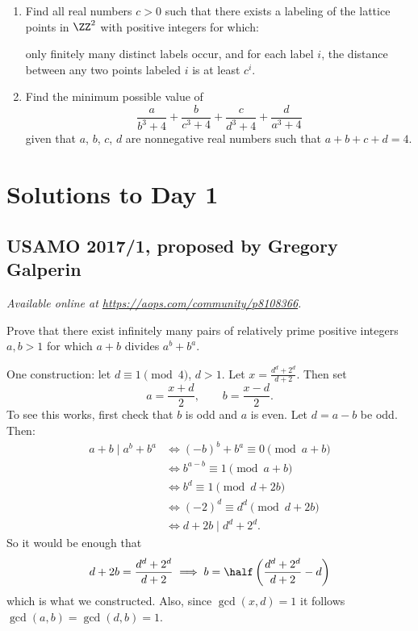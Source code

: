 \documentclass[11pt]{scrartcl}
\begin{document}
\begin{enumerate}[\bfseries 1.]
\item %
Find all real numbers $c > 0$ such that there exists a labeling
of the lattice points in $\ZZ^2$ with positive integers for which:
\begin{itemize}
  \ii only finitely many distinct labels occur, and
  \ii for each label $i$, the distance between any two points
  labeled $i$ is at least $c^i$.
\end{itemize}

\item %
Find the minimum possible value of
\[ \frac{a}{b^3+4} + \frac{b}{c^3+4}
  + \frac{c}{d^3+4} + \frac{d}{a^3+4} \]
given that $a$, $b$, $c$, $d$ are nonnegative real numbers
such that $a+b+c+d=4$.

\end{enumerate}
\pagebreak

\section{Solutions to Day 1}
\subsection{USAMO 2017/1, proposed by Gregory Galperin}
\textsl{Available online at \url{https://aops.com/community/p8108366}.}
\begin{mdframed}[style=mdpurplebox,frametitle={Problem statement}]
Prove that there exist infinitely many pairs of
relatively prime positive integers $a,b > 1$
for which $a+b$ divides $a^b+b^a$.
\end{mdframed}
One construction: let $d \equiv 1 \pmod 4$, $d > 1$.
Let $x = \frac{d^d+2^d}{d+2}$. Then set
\[ a = \frac{x+d}{2}, \qquad
  b = \frac{x-d}{2}. \]
To see this works, first check that $b$ is odd and $a$ is even.
Let $d = a-b$ be odd.
Then:
\begin{align*}
  a+b \mid a^b+b^a &\iff
  (-b)^b + b^a \equiv 0 \pmod{a+b} \\
  &\iff b^{a-b} \equiv 1 \pmod{a+b} \\
  &\iff b^d \equiv 1 \pmod{d+2b} \\
  &\iff (-2)^d \equiv d^d \pmod{d+2b} \\
  &\iff d+2b \mid d^d + 2^d.
\end{align*}
So it would be enough that
\[ d+2b = \frac{d^d+2^d}{d+2}
  \implies b = \half \left( \frac{d^d+2^d}{d+2} - d \right) \]
which is what we constructed.
Also, since $\gcd(x,d) = 1$ it follows $\gcd(a,b) = \gcd(d,b) = 1$.
\end{document}
